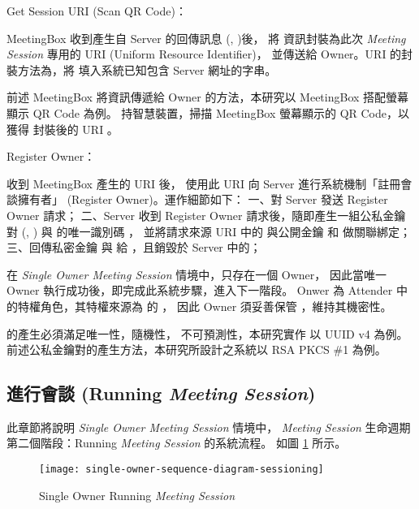 \begin{steps}
    \item Get Session URI (Scan QR Code)：

            MeetingBox 收到產生自 Server 的回傳訊息 (\DEFsessionID, \DEFunsealKey)後，
        將 \DEFsessionID 資訊封裝為此次 {\it Meeting Session} 專用的 URI (Uniform Resource Identifier)，
        並傳送給 Owner。URI 的封裝方法為，將 \DEFsessionID 填入系統已知包含 Server 網址的字串。

            前述 MeetingBox 將資訊傳遞給 Owner 的方法，本研究以 MeetingBox 搭配螢幕顯示 QR Code 為例。
        \DEFowner 持智慧裝置，掃描 MeetingBox 螢幕顯示的 QR Code，以獲得 \DEFsessionID 封裝後的 URI 。

    \item Register Owner：

            \DEFowner 收到 MeetingBox 產生的 URI 後，
        使用此 URI 向 Server 進行系統機制「註冊會談擁有者」 (Register Owner)。運作細節如下：
        一、\DEFowner 對 Server 發送 Register Owner 請求；
        二、Server 收到 Register Owner 請求後，隨即產生一組公私金鑰對 (\DEFpublicKey, \DEFprivateKey)
        與 \DEFowner 的唯一識別碼 \DEFownerID，
        並將請求來源 URI 中的 \DEFsessionID 與公開金鑰 \DEFpublicKey 和 \DEFownerID 做關聯綁定；
        三、回傳私密金鑰 \DEFprivateKey 與 \DEFownerID 給 \DEFowner，且銷毀於 Server 中的\DEFprivateKey；

            在 {\it Single Owner Meeting Session} 情境中，只存在一個 Owner，
        因此當唯一 Owner 執行成功後，即完成此系統步驟，進入下一階段。
        Onwer 為 Attender 中的特權角色，其特權來源為 \DEFowner 的 \DEFprivateKey，
        因此 Owner 須妥善保管 \DEFprivateKey，維持其機密性。

            \DEFownerID 的產生必須滿足唯一性，隨機性，
        不可預測性，本研究實作 \DEFownerID 以 UUID v4 為例。
        前述公私金鑰對的產生方法，本研究所設計之系統以 RSA PKCS \#1 為例。
\end{steps}

\subsection{進行會談 (Running {\it Meeting Session})}
\label{subsec.sessioning}

    此章節將說明 {\it Single Owner Meeting Session} 情境中，
{\it Meeting Session} 生命週期第二個階段：Running {\it Meeting Session} 的系統流程。
如圖 \ref{fig:s-o-sessioning} 所示。

\begin{figure}[H]
    \centering
    \texttt{[image: single-owner-sequence-diagram-sessioning]}
    \caption{Single Owner Running {\it Meeting Session}}
    \label{fig:s-o-sessioning}
\end{figure}

